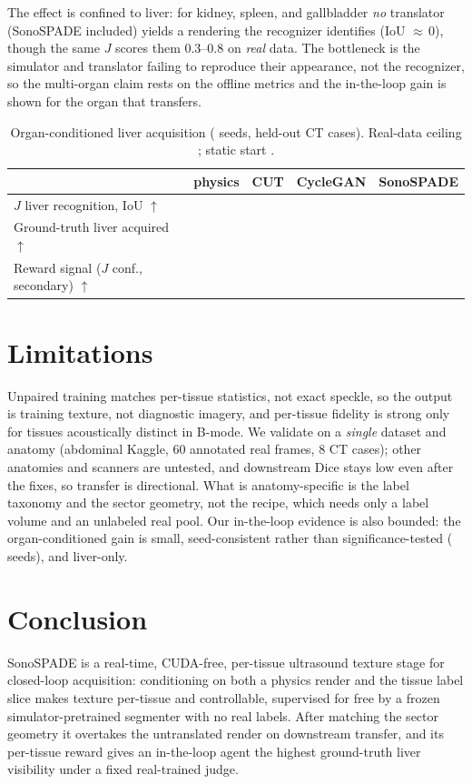 \documentclass[runningheads]{llncs}
\begin{document}
The effect is confined to liver: for kidney, spleen, and gallbladder \emph{no} translator (SonoSPADE included) yields a rendering the recognizer identifies (IoU ${\approx}\,0$), though the same $J$ scores them $0.3$--$0.8$ on \emph{real} data. 
The bottleneck is the simulator and translator failing to reproduce their appearance, not the recognizer, so the multi-organ claim rests on the offline metrics and the in-the-loop gain is shown for the organ that transfers.

\begin{table}[t]
\centering
\caption{Organ-conditioned liver acquisition (\rlSeeds{} seeds, held-out CT cases). Real-data ceiling
\recCeil{}; static start \rlStart{}.}
\label{tab:organrl}
\begin{tabular}{lcccc}
\toprule
 & physics & CUT & CycleGAN & SonoSPADE\\
\midrule
$J$ liver recognition, IoU $\uparrow$        & \recPhys{} & \recCut{} & \recCyc{} & \textbf{\recSono{}}\\
Ground-truth liver acquired $\uparrow$       & \rlPhys{}  & \rlCut{}  & \rlCyc{}  & \textbf{\rlSono{}}\\
Reward signal ($J$ conf., secondary) $\uparrow$ & \rewPhys{} & \rewCut{} & \rewCyc{} & \textbf{\rewSono{}}\\
\bottomrule
\end{tabular}
\end{table}

\section{Limitations}
\label{sec:limitations}
Unpaired training matches per-tissue statistics, not exact speckle, so the output is training texture, not diagnostic imagery, and per-tissue fidelity is strong only for tissues acoustically distinct in B-mode. 
We validate on a \emph{single} dataset and anatomy (abdominal Kaggle, $60$ annotated real frames, $8$ CT cases); other anatomies and scanners are untested, and downstream Dice stays low even after the fixes, so transfer is directional. What is anatomy-specific is the label taxonomy and the sector geometry, not the recipe, which needs only a label volume and an unlabeled real pool. Our in-the-loop evidence is also bounded: the organ-conditioned gain is small, seed-consistent rather than significance-tested (\rlSeeds{} seeds), and liver-only.

\section{Conclusion}
SonoSPADE is a real-time, CUDA-free, per-tissue ultrasound texture stage for closed-loop acquisition: conditioning on both a physics render and the tissue label slice makes texture per-tissue and controllable, supervised for free by a frozen simulator-pretrained segmenter with no real labels. 
After matching the sector geometry it overtakes the untranslated render on downstream transfer, and its per-tissue reward gives an in-the-loop agent the highest ground-truth liver visibility under a fixed real-trained judge. 
\end{document}
